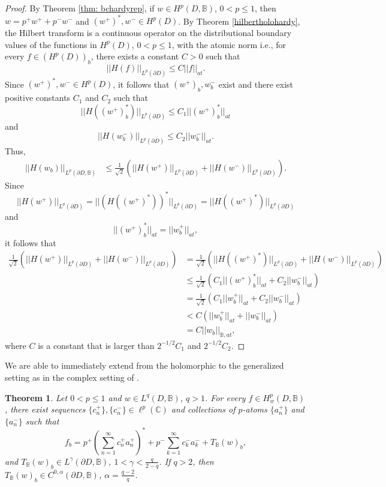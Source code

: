 \documentclass[suppldata]{interact}
\theoremstyle{plain}%
\newtheorem{theorem}{Theorem}[section]
\theoremstyle{definition}
\theoremstyle{remark}
\newcommand{\C}{\mathbb C}
\newcommand{\p}{\partial}
\newcommand{\bc}{\mathbb{B}}
\newcommand{\hpb}{H^p(D,\bc)}
\begin{document}
\begin{proof}
By Theorem \ref{thm: bchardyrep}, if $w \in \hpb$, $0 < p \leq 1$, then $w = p^+ w^+ + p^- w^-$ and $(w^+)^*, w^- \in H^p(D)$. By Theorem \ref{hilbertholohardy}, the Hilbert transform is a continuous operator on the distributional boundary values of the functions in $H^p(D)$, $0 < p \leq 1$, with the atomic norm i.e., for every $f \in (H^p(D))_b$, there exists a constant $C>0$ such that 
\[
    ||H(f)||_{L^p(\p D)} \leq C ||f||_{at}. 
\]
Since $(w^+)^*,w^- \in H^p(D)$, it follows that $(w^+)_b, w^-_b$ exist and there exist positive constants $C_1$ and $C_2$ such that 
\[
||H((w^+)^*_b)||_{L^p(\p D)} \leq C_1 ||(w^+)^*_b||_{at}
\]
and 
\[
||H(w^-_b)||_{L^p(\p D)} \leq C_2 ||w^-_b||_{at}.
\]
Thus, 
\begin{align*}
    ||H(w_b)||_{L^p(\p D, \bc)} 
    &\leq \frac{1}{\sqrt{2}}\left(  ||H(w^+)||_{L^p(\p D)} + ||H(w^-)||_{L^p(\p D)} \right) .
\end{align*}
Since
\[
    ||H(w^+)||_{L^p(\p D)} = ||(H((w^+)^*))^*||_{L^p(\p D)} = ||H((w^+)^*)||_{L^p(\p D)} 
\]
and
\[
        ||(w^+)^*_b||_{at} = ||w^+_b||_{at},
\]
it follows that 
\begin{align*}
\frac{1}{\sqrt{2}}\left(  ||H(w^+)||_{L^p(\p D)} + ||H(w^-)||_{L^p(\p D)} \right) 
&= \frac{1}{\sqrt{2}}\left(  ||H((w^+)^*)||_{L^p(\p D)} + ||H(w^-)||_{L^p(\p D)} \right) \\
&\leq \frac{1}{\sqrt{2}}\left(  C_1 ||(w^+)^*_b||_{at} + C_2 ||w^-_b||_{at} \right) \\
&= \frac{1}{\sqrt{2}}\left(  C_1 ||w^+_b||_{at} + C_2 ||w^-_b||_{at} \right) \\
& < C \left( ||w^+_b||_{at} +  ||w^-_b||_{at}\right) \\
&= C ||w_b||_{\bc,at},
\end{align*}
where $C$ is a constant that is larger than $2^{-1/2}C_1$ and $2^{-1/2}C_2$.


\end{proof}


We are able to immediately extend from the holomorphic to the generalized setting as in the complex setting of \cite{WB}. 

\begin{theorem}\label{bcgeneralhardyatomicdecomp}
Let $0 < p \leq 1$ and $ w \in L^q(D,\bc)$, $q>1$. For every $f \in H^p_w(D, \bc)$, there exist sequences $\{c_n^+\}, \{c_n^-\} \in \ell^p(\C)$ and collections of $p$-atoms $\{a_n^+\}$ and $\{a_n^-\}$ such that 
    \[
        f_b = p^+ \left( \sum_{n=1}^\infty c^+_n a^+_n\right)^* + p^- \sum_{k=1}^\infty c^-_k a^-_k + T_\bc(w)_b,
    \]
    and $T_\bc(w)_b \in L^\gamma(\p D,\bc)$, $1 < \gamma< \frac{q}{2-q}$. If $q>2$, then $T_\bc(w)_b \in C^{0,\alpha}(\p D,\bc)$, $\alpha = \frac{q-2}{q}$. 
\end{theorem}
\end{document}
